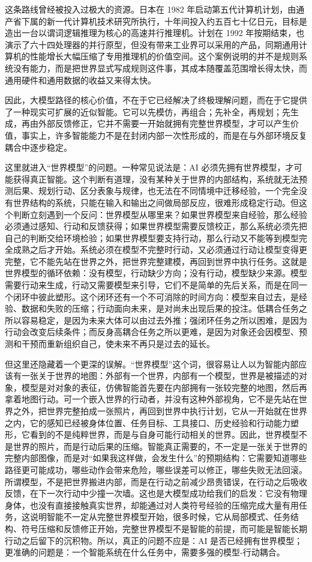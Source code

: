 这条路线曾经被投入过极大的资源。日本在 1982 年启动第五代计算机计划，由通产省下属的新一代计算机技术研究所执行，十年间投入约五百七十亿日元，目标是造出一台以谓词逻辑推理为核心的高速并行推理机。计划在 1992 年按期结束，也演示了六十四处理器的并行原型，但没有带来工业界可以采用的产品，同期通用计算机的性能增长大幅压缩了专用推理机的价值空间\cite{aiso1988fifth,feigenbaum1993japanese}。这个案例说明的并不是规则系统没有能力，而是把世界显式写成规则这件事，其成本随覆盖范围增长得太快，而通用硬件和通用数据的收益又来得太快。

因此，大模型路径的核心价值，不在于它已经解决了终极理解问题，而在于它提供了一种现实可扩展的近似智能。它可以先模仿，再组合；先补全，再规划；先生成，再由外部反馈修正，它并不需要一开始就拥有完整世界模型，才可以产生价值，事实上，许多智能能力不是在封闭内部一次性形成的，而是在与外部环境反复耦合中逐步稳定。


这里就进入“世界模型”的问题。一种常见说法是：AI 必须先拥有世界模型，才可能获得真正智能。这个判断有道理，没有某种关于世界的内部结构，系统就无法预测后果、规划行动、区分表象与规律，也无法在不同情境中迁移经验，一个完全没有世界结构的系统，只能在输入和输出之间做局部反应，很难形成稳定行动。但这个判断立刻遇到一个反问：世界模型从哪里来？如果世界模型来自经验，那么经验必须通过感知、行动和反馈获得；如果世界模型需要反馈校正，那么系统必须先把自己的判断交给环境检验；如果世界模型要支持行动，那么行动又不能等到模型完全成熟之后才开始。系统必须在模型不完整时行动，又必须通过行动让模型变得更完整，它不能先站在世界之外，把世界完整建模，再回到世界中执行任务。这就是世界模型的循环依赖：没有模型，行动缺少方向；没有行动，模型缺少来源。模型需要行动来生成，行动又需要模型来引导，它们不是简单的先后关系，而是在同一个闭环中彼此塑形。这个闭环还有一个不可消除的时间方向：模型来自过去，是经验、数据和失败的压缩；行动面向未来，是对尚未出现后果的投注。低耦合任务之所以容易稳定，是因为未来大体可以由过去外推；强闭环任务之所以困难，是因为行动会改变后续条件；而反身高耦合任务之所以更难，是因为对象还会因模型、预测和干预而重新组织自己，使未来不再只是过去的延长。

但这里还隐藏着一个更深的误解。“世界模型”这个词，很容易让人以为智能内部应该有一张关于世界的地图：外部有一个世界，内部有一个模型，世界是被描述的对象，模型是对对象的表征，仿佛智能首先要在内部拥有一张较完整的地图，然后再拿着地图行动。可一个嵌入世界的行动者，并没有这种外部视角，它不是先站在世界之外，把世界完整拍成一张照片，再回到世界中执行计划，它从一开始就在世界之内，它的感知已经被身体位置、任务目标、工具接口、历史经验和行动能力塑形，它看到的不是纯粹世界，而是与自身可能行动相关的世界。因此，世界模型不是世界的照片，而是行动后果的压缩。智能真正需要的，不一定是一张关于世界的完整内部图像，而是对“如果我这样做，会发生什么”的预期结构：它需要知道哪些路径更可能成功，哪些动作会带来危险，哪些误差可以修正，哪些失败无法回滚。所谓模型，不是把世界搬进内部，而是在行动之前减少昂贵错误，在行动之后吸收反馈，在下一次行动中少撞一次墙。这也是大模型成功给我们的启发：它没有物理身体，也没有直接接触真实世界，却能通过对人类符号经验的压缩完成大量有用任务，这说明智能不一定从完整世界模型开始，很多时候，它从局部模式、任务结构、符号压缩和反馈修正开始，完整世界模型不是智能的前提，而可能是智能长期行动之后留下的沉积物。所以，真正的问题不应是：AI 是否已经拥有世界模型；更准确的问题是：一个智能系统在什么任务中，需要多强的模型-行动耦合。

